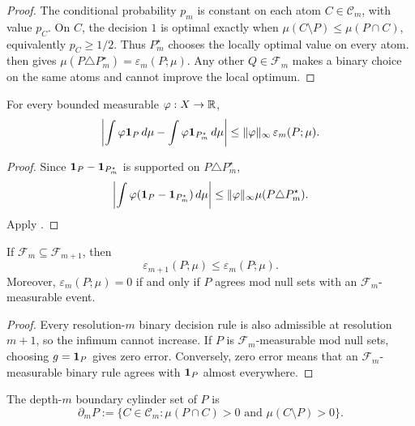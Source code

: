 \begin{proof}
The conditional probability \(p_m\) is constant on each atom \(C\in\mathcal C_m\), with value \(p_C\).  On \(C\), the decision \(1\) is optimal exactly when \(\mu(C\setminus P)\le \mu(P\cap C)\), equivalently \(p_C\ge1/2\).  Thus \(P_m^\star\) chooses the locally optimal value on every atom.   then gives \(\mu(P\triangle P_m^\star)=\varepsilon_m(P;\mu)\).  Any other \(Q\in\mathcal F_m\) makes a binary choice on the same atoms and cannot improve the local optimum.
\end{proof}

\begin{corollary}
\label{cor:observable-stability}
For every bounded measurable \(\varphi:X\to\mathbb{R}\),
\[
\left|
\int \varphi\mathbf{1}_P\,d\mu
-
\int \varphi\mathbf{1}_{P_m^\star}\,d\mu
\right|
\le
\|\varphi\|_\infty\,\varepsilon_m(P;\mu).
\]
\end{corollary}

\begin{proof}
Since \(\mathbf{1}_P-\mathbf{1}_{P_m^\star}\) is supported on \(P\triangle P_m^\star\),
\[
\left|\int \varphi(\mathbf{1}_P-\mathbf{1}_{P_m^\star})\,d\mu\right|
\le
\|\varphi\|_\infty\mu(P\triangle P_m^\star).
\]
Apply .
\end{proof}

\begin{proposition}[Monotonicity]
\label{prop:scan-error-monotonicity}
If \(\mathcal F_m\subseteq\mathcal F_{m+1}\), then
\[
\varepsilon_{m+1}(P;\mu)\le \varepsilon_m(P;\mu).
\]
Moreover, \(\varepsilon_m(P;\mu)=0\) if and only if \(P\) agrees mod null sets with an \(\mathcal F_m\)-measurable event.
\end{proposition}

\begin{proof}
Every resolution-\(m\) binary decision rule is also admissible at resolution \(m+1\), so the infimum cannot increase.  If \(P\) is \(\mathcal F_m\)-measurable mod null sets, choosing \(g=\mathbf{1}_P\) gives zero error.  Conversely, zero error means that an \(\mathcal F_m\)-measurable binary rule agrees with \(\mathbf{1}_P\) almost everywhere.
\end{proof}

\begin{definition}
\label{def:boundary-cylinders}
The depth-\(m\) boundary cylinder set of \(P\) is
\[
\partial_mP:=
\{C\in\mathcal C_m:\mu(P\cap C)>0\text{ and }\mu(C\setminus P)>0\}.
\]
\end{definition}

